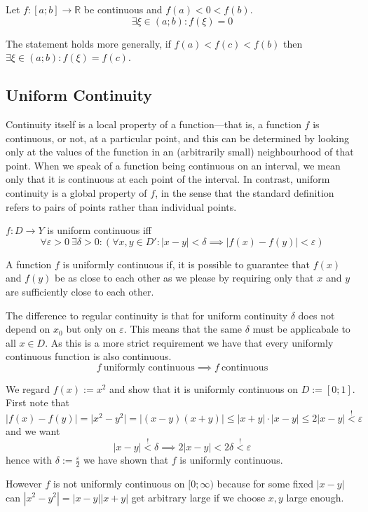 \begin{theorem}\label{thm:intmd_value}
   Let \(f: [a; b] \to \mathbb{R}\) be continuous and \(f(a) < 0 < f(b)\).
   \[\exists \xi \in (a;b): f(\xi) = 0\]
\end{theorem}
\begin{remark}[Tips]
   The statement holds more generally, if \(f(a) < f(c) < f(b)\) then \(\exists \xi \in (a;b): f(\xi) = f(c)\).
\end{remark}

\subsection{Uniform Continuity}
Continuity itself is a local property of a function—that is, a function \(f\) is continuous, or not, at a particular point, and this can be determined by looking only at the values of the function in an (arbitrarily small) neighbourhood of that point.
When we speak of a function being continuous on an interval, we mean only that it is continuous at each point of the interval.
In contrast, uniform continuity is a global property of \(f\), in the sense that the standard definition refers to pairs of points rather than individual points.

\begin{definition}
   \(f: D \to Y\) is uniform continuous iff
   \[\forall \varepsilon > 0~\exists \delta > 0: (\forall x,y \in D': |x - y| < \delta \implies |f(x) - f(y)| < \varepsilon)\]
\end{definition}
\begin{remark}[Intuition]
   A function \(f\) is uniformly continuous if, it is possible to guarantee that \(f(x)\) and \(f(y)\) be as close to each other as we please by requiring only that \(x\) and \(y\) are sufficiently close to each other.
\end{remark}
\begin{remark}
   The difference to regular continuity is that for uniform continuity \(\delta\) does not depend on \(x_0\) but only on \(\varepsilon\).
   This means that the same \(\delta\) must be applicabale to all \(x \in D\).
   As this is a more strict requirement we have that every uniformly continuous function is also continuous.
   \[f~\text{uniformly continuous} \implies f~\text{continuous}\]
\end{remark}
\begin{example}
   We regard \(f(x) := x^2\) and show that it is uniformly continuous on \(D := [0; 1]\).
   First note that
   \[\lvert f(x)-f(y)\rvert = \lvert x^2-y^2\rvert = \lvert (x-y)(x+y)\rvert \leq \lvert x+y\rvert \cdot \lvert x-y\rvert \leq 2\lvert x-y\rvert \overset{!}{<} \varepsilon\]
   and we want
   \[\lvert x-y\rvert \overset{!}{<} \delta \implies 2 \lvert x-y\rvert < 2 \delta \overset{!}{<} \varepsilon\]
   hence with \(\delta := \frac{\varepsilon}{2}\) we have shown that \(f\) is uniformly continuous.

   However \(f\) is not uniformly continuous on \([0; \infty)\) because for some fixed \(|x - y|\) can \(|x^2 - y^2| = |x - y||x + y|\) get arbitrary large if we choose \(x, y\) large enough.
\end{example}


